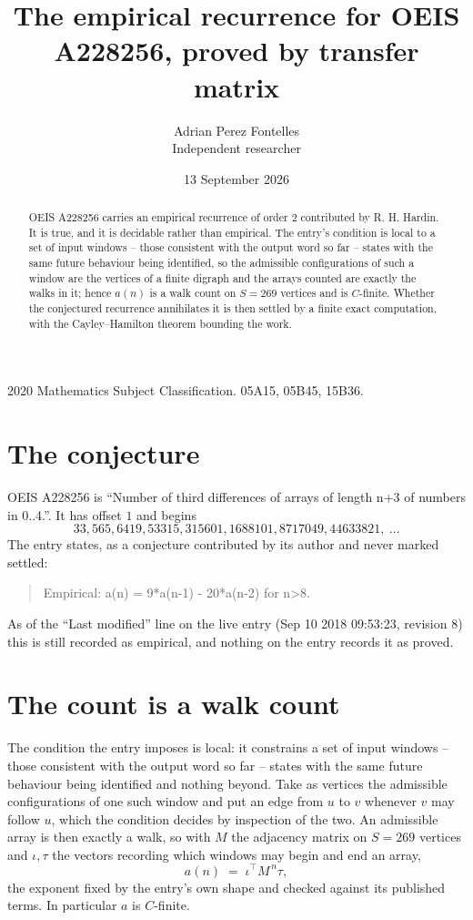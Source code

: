\documentclass[11pt,a4paper]{article}
\title{The empirical recurrence for OEIS A228256, proved by transfer matrix}
\author{Adrian Perez Fontelles\\ \small Independent researcher}
\date{13 September 2026}
\theoremstyle{plain}
\theoremstyle{definition}
\begin{document}
\maketitle

\begin{abstract}
OEIS A228256 carries an empirical recurrence of order $2$ contributed by R. H. Hardin. It is
true, and it is decidable rather than empirical. The entry's condition is local to a set of input windows -- those consistent with the output word so far -- states with the same future behaviour being identified, so
the admissible configurations of such a window are the vertices of a finite digraph and the
arrays counted are exactly the walks in it; hence $a(n)$ is a walk count on $S=269$ vertices
and is $C$-finite. Whether the conjectured recurrence annihilates it is then settled by a
finite exact computation, with the Cayley--Hamilton theorem bounding the work.
\end{abstract}

\noindent\small 2020 Mathematics Subject Classification. 05A15, 05B45, 15B36.\normalsize

\section{The conjecture}

OEIS A228256 is ``Number of third differences of arrays of length n+3 of numbers in 0..4.''. It has offset $1$ and begins
\[
33, 565, 6419, 53315, 315601, 1688101, 8717049, 44633821,\ \dots
\]
The entry states, as a conjecture contributed by its author and never marked settled:
\begin{quote}
Empirical: a(n) = 9*a(n-1) - 20*a(n-2) for n>8.
\end{quote}
As of the ``Last modified'' line on the live entry (Sep 10 2018 09:53:23, revision 8) this is still
recorded as empirical, and nothing on the entry records it as proved.

\section{The count is a walk count}

The condition the entry imposes is local: it constrains a set of input windows -- those consistent with the output word so far -- states with the same future behaviour being identified and nothing beyond. Take as
vertices the admissible configurations of one such window and put an edge from $u$ to $v$
whenever $v$ may follow $u$, which the condition decides by inspection of the two. An
admissible array is then exactly a walk, so with $M$ the adjacency matrix on $S=269$ vertices
and $\iota,\tau$ the vectors recording which windows may begin and end an array,
\[
a(n)\;=\;\iota^{\!\top}M^{\,n}\tau ,
\]
the exponent fixed by the entry's own shape and checked against its published terms. In
particular $a$ is $C$-finite.
\end{document}

